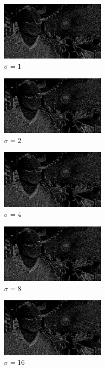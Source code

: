 \documentclass{article}
\begin{document}
\begin{figure}[H]
    \centering
    \includegraphics[width = 0.45\textwidth]{imgs/mh-1.jpg}
    \caption{$\sigma=1$}
    \label{fig:mh_1}
\end{figure}

\begin{figure}[H]
    \centering
    \includegraphics[width = 0.45\textwidth]{imgs/mh-2.jpg}
    \caption{$\sigma=2$}
    \label{fig:mh_2}
\end{figure}

\begin{figure}[H]
    \centering
    \includegraphics[width = 0.45\textwidth]{imgs/mh-4.jpg}
    \caption{$\sigma=4$}
    \label{fig:mh_4}
\end{figure}

\begin{figure}[H]
    \centering
    \includegraphics[width = 0.45\textwidth]{imgs/mh-8.jpg}
    \caption{$\sigma=8$}
    \label{fig:mh_8}
\end{figure}

\begin{figure}[H]
    \centering
    \includegraphics[width = 0.45\textwidth]{imgs/mh-16.jpg}
    \caption{$\sigma=16$}
    \label{fig:mh_16}
\end{figure}
\end{document}
